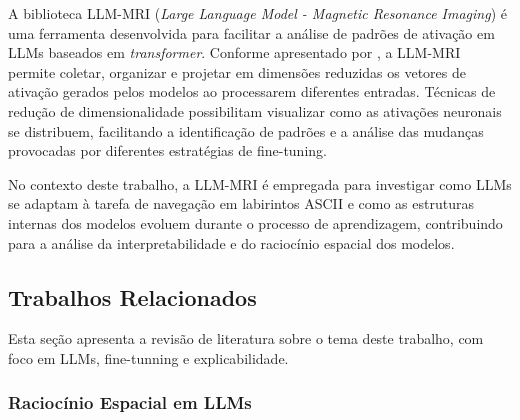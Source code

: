A biblioteca LLM-MRI (\textit{Large Language Model - Magnetic Resonance Imaging}) é uma ferramenta desenvolvida para facilitar a análise de padrões de ativação em LLMs baseados em \textit{transformer}. Conforme apresentado por \cite{costa2024llmmri}, a LLM-MRI permite coletar, organizar e projetar em dimensões reduzidas os vetores de ativação gerados pelos modelos ao processarem diferentes entradas. Técnicas de redução de dimensionalidade possibilitam visualizar como as ativações neuronais se distribuem, facilitando a identificação de padrões e a análise das mudanças provocadas por diferentes estratégias de fine-tuning.

No contexto deste trabalho, a LLM-MRI é empregada para investigar como LLMs se adaptam à tarefa de navegação em labirintos ASCII e como as estruturas internas dos modelos evoluem durante o processo de aprendizagem, contribuindo para a análise da interpretabilidade e do raciocínio espacial dos modelos.
\subsection{Trabalhos Relacionados}

Esta seção apresenta a revisão de literatura sobre o tema deste trabalho, com foco em LLMs, fine-tunning e explicabilidade.

\subsubsection{Raciocínio Espacial em LLMs}


